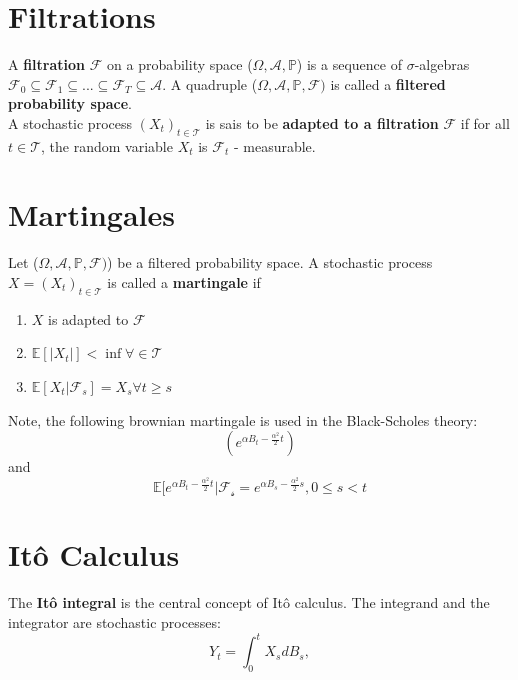 \documentclass[a4paper]{report}
\begin{document}
\begin{itemize}
\section{ Filtrations}

A \textbf{filtration} $\mathcal{F}$ on a probability space  ($\Omega, \mathcal{A}, \mathbb{P}$) is a sequence of $\sigma$-algebras $\mathcal{F}_0 \subseteq \mathcal{F}_1 \subseteq ...  \subseteq \mathcal{F}_T \subseteq \mathcal{A}$. A quadruple ($\Omega, \mathcal{A}, \mathbb{P}, \mathcal{F})$ is called a \textbf{filtered probability space}.\\
A stochastic process $(X_t)_{t \in \mathcal{T}}$ is sais to be \textbf{adapted to a filtration} $\mathcal{F}$ if for all $t \in \mathcal{T}$, the random variable $X_t$ is $\mathcal{F}_t$ - measurable.\\

\section{ Martingales}

Let ($\Omega, \mathcal{A}, \mathbb{P}, \mathcal{F})$) be a filtered probability space. A stochastic process $X = (X_t)_{ t \in \mathcal{T}}$ is called a \textbf{martingale} if
\begin{enumerate}
\item $X$ is adapted to $\mathcal{F}$
\item $\mathbb{E} [|X_t|] < \inf \forall \in \mathcal{T}$
\item $\mathbb{E} [X_t|\mathcal{F}_s]=X_s \forall t \geq s$
\end{enumerate}
Note, the following brownian martingale is used in the Black-Scholes theory:
\begin{equation}
(e^{\alpha B_t - \frac{\alpha^2}{2}t})
\end{equation}
and 
\begin{equation}
\mathbb{E}[e^{\alpha B_t - \frac{\alpha^2}{2}t}|\mathcal{F_s} = e^{\alpha B_s - \frac{\alpha^2}{2}s}, 0 \leq s < t
\end{equation}

\section{Itô Calculus } 

The \textbf{Itô integral} is the central concept of Itô calculus. The integrand and the integrator  are  stochastic processes:
\begin{equation}
Y_t=\int_0^t X_s dB_s,
\end{equation}


\end{itemize}
\end{document}
